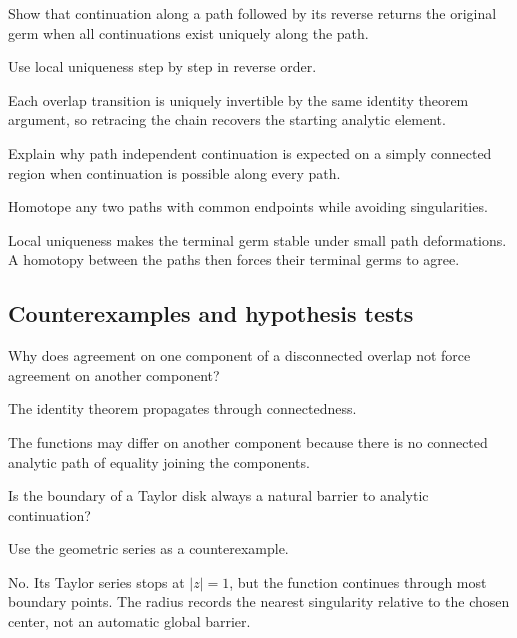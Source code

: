 \begin{exercise}\label{exr:iv15-expand-08}
Show that continuation along a path followed by its reverse returns the original germ when all continuations exist uniquely along the path.
\end{exercise}
\begin{hint}
Use local uniqueness step by step in reverse order.
\end{hint}
\begin{solution}
Each overlap transition is uniquely invertible by the same identity theorem argument, so retracing the chain recovers the starting analytic element.
\end{solution}

\begin{exercise}\label{exr:iv15-expand-09}
Explain why path independent continuation is expected on a simply connected region when continuation is possible along every path.
\end{exercise}
\begin{hint}
Homotope any two paths with common endpoints while avoiding singularities.
\end{hint}
\begin{solution}
Local uniqueness makes the terminal germ stable under small path deformations. A homotopy between the paths then forces their terminal germs to agree.
\end{solution}

\subsection*{Counterexamples and hypothesis tests}

\begin{exercise}\label{exr:iv15-expand-10}
Why does agreement on one component of a disconnected overlap not force agreement on another component?
\end{exercise}
\begin{hint}
The identity theorem propagates through connectedness.
\end{hint}
\begin{solution}
The functions may differ on another component because there is no connected analytic path of equality joining the components.
\end{solution}

\begin{exercise}\label{exr:iv15-expand-11}
Is the boundary of a Taylor disk always a natural barrier to analytic continuation?
\end{exercise}
\begin{hint}
Use the geometric series as a counterexample.
\end{hint}
\begin{solution}
No. Its Taylor series stops at \(|z|=1\), but the function continues through most boundary points. The radius records the nearest singularity relative to the chosen center, not an automatic global barrier.
\end{solution}

